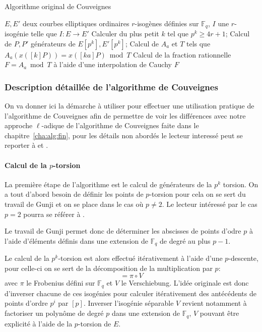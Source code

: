 \documentclass[10pt,a4paper]{book}
\theoremstyle{plain}
\theoremstyle{definition}
\theoremstyle{definition}
\theoremstyle{definition}
\theoremstyle{definition}
\theoremstyle{remark}
\theoremstyle{remark}
\theoremstyle{definition}
\begin{document}
\begin{algorithm}
\caption{\label{alg:orig:Couv} Algorithme original de Couveignes}
\begin{algorithmic}[1]
\REQUIRE $E,E'$ deux courbes elliptiques ordinaires $r$-isogènes définies sur $\mathbb{F}_q$,%
\ENSURE $I$ une $r$-isogénie telle que $I:E \rightarrow E'$
\STATE Calculer du plus petit $k$ tel que $p^k \geqslant 4r+1$;
\STATE Calcul de $P,P'$ générateurs de $E[p^k],E'[p^k]$;
\STATE Calcul de $A_a$ et $T$ tels que $A_a(x([k]P))=x([ka]P) \bmod T$
\STATE Calcul de la fraction rationnelle $F=A_a \bmod T$ à l'aide d'une 
interpolation de Cauchy
\RETURN $F$
\ENDIF
\ENDFOR
\end{algorithmic}
\end{algorithm}

\subsubsection{Description détaillée de l'algorithme de Couveignes }
On va donner ici la démarche à utiliser pour effectuer une utilisation 
pratique de l'algorithme de Couveignes afin de permettre de voir les différences
avec notre approche $\ell$-adique de l'algorithme de Couveignes faite dans le
chapitre~\ref{cha:alg:fin}, pour les détails non abordés le lecteur interessé 
peut se reporter à \cite{Couveignes96} et \cite{DeFeo11}.

\paragraph{Calcul de la $p$-torsion}
La première étape de l'algorithme est le calcul de générateurs de la $p^k$ 
torsion. On a tout d'abord besoin de définir les points de $p$-torsion pour 
cela on se sert du travail de Gunji \cite{Gunji76} et on se place dans le cas 
où $p \neq 2$. Le lecteur intéressé par le cas $p=2$ pourra se référer à 
\cite[§3.2]{DeFeo11}.

Le travail de Gunji \cite[Theorem 4]{Gunji76} permet donc de déterminer les 
abscisses de points d'odre $p$ à l'aide d'éléments définis dans une extension 
de $\mathbb{F}_q$ de degré au plus $p-1$.  

Le calcul de la $p^k$-torsion est alors effectué itérativement à l'aide d'une 
$p$-descente, pour celle-ci on se sert de la décomposition de la multiplication
par $p$: 
\begin{equation}
[p]=\pi \circ V
\end{equation}
avec $\pi$ le Frobenius défini sur $\mathbb{F}_q$ et $V$ le Verschiebung. 
L'idée originale est donc d'inverser chacune  de ces isogénies pour calculer 
itérativement des antécédents de points d'ordre $p^i$ par $[p]$. Inverser 
l'isogénie séparable $V$ revient notamment à factoriser un polynôme de degré 
$p$ dans une extension de $\mathbb{F}_q$, $V$ pouvant être explicité à l'aide 
de la $p$-torsion de $E$. 
\end{document}

